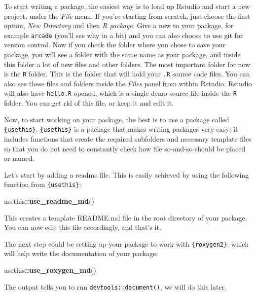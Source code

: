 \documentclass[
]{article}
\newenvironment{Shaded}{\begin{snugshade}}{\end{snugshade}}
\newcommand{\KeywordTok}[1]{\textcolor[rgb]{0.13,0.29,0.53}{\textbf{#1}}}
\newcommand{\NormalTok}[1]{#1}
\newcommand{\OperatorTok}[1]{\textcolor[rgb]{0.81,0.36,0.00}{\textbf{#1}}}
\begin{document}
To start writing a package, the easiest way is to load up Rstudio and start a new project, under the
\emph{File} menu. If you're starting from scratch, just choose the first option, \emph{New Directory} and then
\emph{R package}. Give a new to your package, for example \texttt{arcade} (you'll see why in a bit) and you can
also choose to use git for version control. Now if you check the folder where you chose to save
your package, you will see a folder with the same name as your package, and inside this folder a
lot of new files and other folders. The most important folder for now is the \texttt{R} folder. This is
the folder that will hold your \texttt{.R} source code files. You can also see these files and folders
inside the \emph{Files} panel from within Rstudio. Rstudio will also have \texttt{hello.R} opened, which is a
single demo source file inside the \texttt{R} folder. You can get rid of this file, or keep it and edit it.

Now, to start working on your package, the best is to use a package called \texttt{\{usethis\}}. \texttt{\{usethis\}}
is a package that makes writing packages very easy; it includes functions that create the required
subfolders and necessary template files so that you do not need to constantly check how file so-and-so
should be placed or named.

Let's start by adding a readme file. This is easily achieved by using the following function from
\texttt{\{usethis\}}:

\begin{Shaded}
\begin{Highlighting}[]
\NormalTok{usethis}\OperatorTok{::}\KeywordTok{use\_readme\_md}\NormalTok{()}
\end{Highlighting}
\end{Shaded}

This creates a template README.md file in the root directory of your package. You can now edit this
file accordingly, and that's it.

The next step could be setting up your package to work with \texttt{\{roxygen2\}}, which will help write
the documentation of your package:

\begin{Shaded}
\begin{Highlighting}[]
\NormalTok{usethis}\OperatorTok{::}\KeywordTok{use\_roxygen\_md}\NormalTok{()}
\end{Highlighting}
\end{Shaded}

The output tells you to run \texttt{devtools::document()}, we will do this later.
\end{document}
